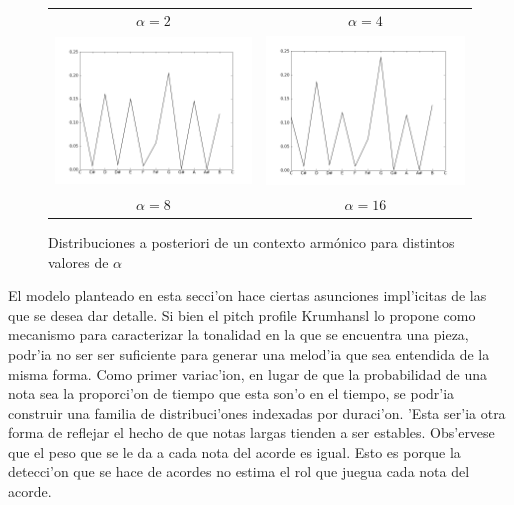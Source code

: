 \begin{figure}[htp]
\begin{center}
\begin{tabular}{cc}
        $\alpha=2$ & $\alpha=4$ \\
        \includegraphics[width=7.5cm]{images/posteriors/posterior-profile-8.png} &
        \includegraphics[width=7.5cm]{images/posteriors/posterior-profile-16.png} \\
        $\alpha=8$ & $\alpha=16$ \\

        \end{tabular}
        \caption{Distribuciones a posteriori de un contexto arm\'onico para distintos valores de $\alpha$}
        \label{fig:pitch_posteriors}
    \end{center}      
\end{figure}

El modelo planteado en esta secci'on hace ciertas asunciones impl'icitas de las que se desea dar detalle. 
Si bien el pitch profile Krumhansl lo propone como mecanismo para caracterizar la tonalidad en la que se encuentra una pieza, 
podr'ia no ser ser suficiente para generar una melod'ia que sea entendida de la misma forma. 
Como primer variac'ion, en lugar de que la probabilidad de una nota sea la proporci'on de tiempo que esta son'o en el tiempo, 
se podr'ia construir una familia de distribuci'ones indexadas por duraci'on. 'Esta ser'ia otra forma de reflejar el hecho de que notas largas tienden a ser estables.
Obs'ervese que el peso que se le da a cada nota del acorde es igual. Esto es porque la detecci'on que se hace de acordes no estima el rol que juegua cada nota del acorde.

